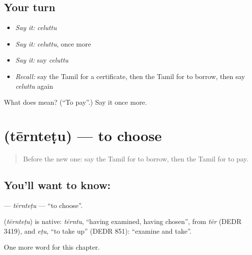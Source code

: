 \subsection*{Your turn}
\begin{itemize}
\raggedright
  \item \emph{Say it:} \emph{celuttu}
  \item \emph{Say it:} \emph{celuttu}, once more
  \item \emph{Say it:} say \emph{celuttu}
  \item \emph{Recall:} say the Tamil for a certificate, then the Tamil for to borrow, then say \emph{celuttu} again
\end{itemize}

\begin{tcolorbox}[breakable,colback=teal!4,colframe=teal!35!black,title={Before you move on}]
What does  mean? (\textquotedblleft{}To pay\textquotedblright{}.) Say it once more.
\end{tcolorbox}
\section[\texorpdfstring{\ta{தேர்ந்தெடு} (tērnteṭu)}{தேர்ந்தெடு (tērnteṭu)}]{ (tērnteṭu) — to choose}

\label{lesson:TA-C254-terntetu}



\begin{quote}
Before the new one: say the Tamil for to borrow, then the Tamil for to pay.
\end{quote}

\subsection*{You'll want to know: }
\textbf{} — \emph{tērnteṭu} — \textquotedblleft{}to choose\textquotedblright{}.

\begin{cousinweb}
\textbf{} (\emph{tērnteṭu}) is native: \emph{tērntu}, \textquotedblleft{}having examined, having chosen\textquotedblright{}, from \emph{tēr} (DEDR 3419), and \emph{eṭu}, \textquotedblleft{}to take up\textquotedblright{} (DEDR 851): \textquotedblleft{}examine and take\textquotedblright{}.
\end{cousinweb}

\begin{grammarlens}[title={What you've built}]
One more word for this chapter.
\end{grammarlens}

